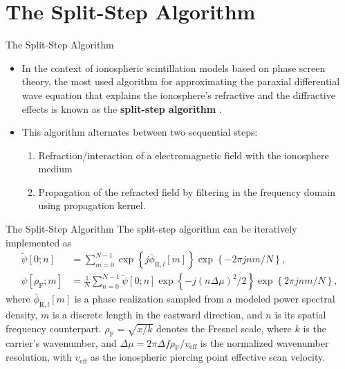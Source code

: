 \documentclass[10pt]{beamer}
\begin{document}
\section{The Split-Step Algorithm}

\begin{frame}{The Split-Step Algorithm}
    \begin{itemize}
        \item In the context of ionospheric scintillation models based on phase screen theory, the most used algorithm for approximating the paraxial differential wave equation that explains the ionosphere's refractive and the diffractive effects is known as the \textbf{split-step algorithm} \parencite[Section 2.2]{vasylyevModelingIonosphericScintillation2022}.
        \item This algorithm alternates between two sequential steps:
        \begin{enumerate}
            \item Refraction/interaction of a electromagnetic field with the ionosphere medium
            \item Propagation of the refracted field by filtering in the frequency domain using propagation kernel.
        \end{enumerate}
    \end{itemize}
\end{frame}

\begin{frame}{The Split-Step Algorithm}
    The split-step algorithm can be iteratively implemented as \parencite[Equations 9 and 10]{jiaoIonosphericScintillationSimulation2018}
    \begin{align}
        \label{eq:idft_phase_realization_simplified}
        \tilde{\psi}\left[0; n\right] &= \sum^{N-1}_{m=0}{\exp\left\{ j \overline{\phi}_{\mathrm{R}, l}\left[m\right] \right\} \exp\left\{ -2\pi j n m / N \right\}} \mathrm{,} \\
        \label{eq:post-prop_scint_field}
        \psi \left[\rho_{\mathrm{F}}; m\right] &= \frac{1}{N} \sum_{n=0}^{N-1} \tilde{\psi}\left[0; n\right]
        \exp \left\{ -j\left( n\Delta \mu \right)^2 /2 \right\}
        \exp \left\{ 2\pi j n m /N \right\} \mathrm{,}
    \end{align}
    where $\overline{\phi}_{\mathrm{R}, l}\left[m\right]$ is a phase realization sampled from a modeled power spectral density, $m$ is a discrete length in the eastward direction, and $n$ is its spatial frequency counterpart. $\rho_{\mathrm{F}} = \sqrt{x / k}$ denotes the Fresnel scale, where $k$ is the carrier's wavenumber, and $\Delta \mu = 2 \pi \Delta f \rho_{\mathrm{F}} / v_{\mathrm{eff}}$ is the normalized wavenumber resolution, with $v_{\mathrm{eff}}$ as the ionospheric piercing point effective scan velocity.
\end{frame}
\end{document}
